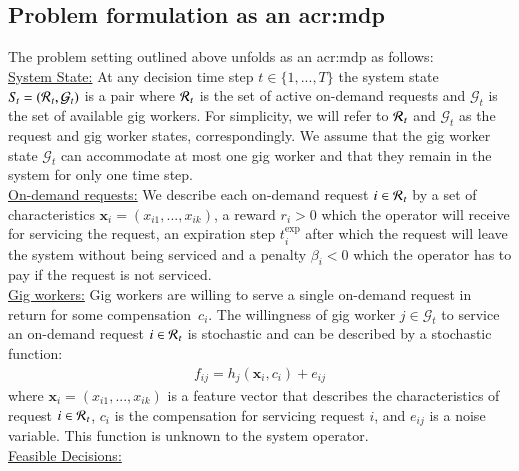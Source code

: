 \subsection{Problem formulation as an \gls{acr:mdp}}
The problem setting outlined above unfolds as an \gls{acr:mdp} as follows:\\
\noindent \underline{System State:} 
At any decision time step $t \in \{1,...,T\}$ the system state  $S\hspace{-0.1em}_t = (\mathcal{R}\hspace{0.05em}_{t},\mathcal{G}_t)$ is a pair where $\mathcal{R}\hspace{0.05em}_t$ is the set of active on-demand requests and $\mathcal{G}_t$ is the set of available gig workers. For simplicity, we will refer to $\mathcal{R}\hspace{0.05em}_{t}$ and $\mathcal{G}_t$ as the request and gig worker states, correspondingly. We assume that the gig worker state $\mathcal{G}_t$ can accommodate at most one gig worker and that they remain in the system for only one time step.  \\
\noindent \underline{On-demand requests:} 
We describe each on-demand request $i \in \mathcal{R}\hspace{0.05em}_{t}$ by a set of characteristics $\mathbf{x}_i =(x_{i1},...,x_{ik})$, a reward $r_i>0$ which the operator will receive for servicing the request, an expiration step $t_i^{\mathrm{exp}}$ after which the request will leave the system without being serviced and a penalty $\beta_i<0$ which the operator has to pay if the request is not serviced. \\
\noindent \underline{Gig workers:} 
Gig workers are willing to serve a single on-demand request in return for some compensation~$c_i$. The willingness of gig worker $j \in \mathcal{G}_t$ to service an on-demand request $i \in \mathcal{R}\hspace{0.05em}_{t}$ is stochastic and can be described by a stochastic function:
\begin{align}
f_{ij} = h_j(\mathbf{x}_i,c_i) + e_{ij} \label{eq:util}
\end{align}
where $\mathbf{x}_i = (x_{i1}, ..., x_{ik})$ is a feature vector that describes the characteristics of request $i \in \mathcal{R}\hspace{0.05em}_{t}$, $c_i$ is the compensation for servicing request $i$, and $e_{ij}$ is a noise variable. This function is unknown to the system operator. \\
\noindent \underline{Feasible Decisions:} 
